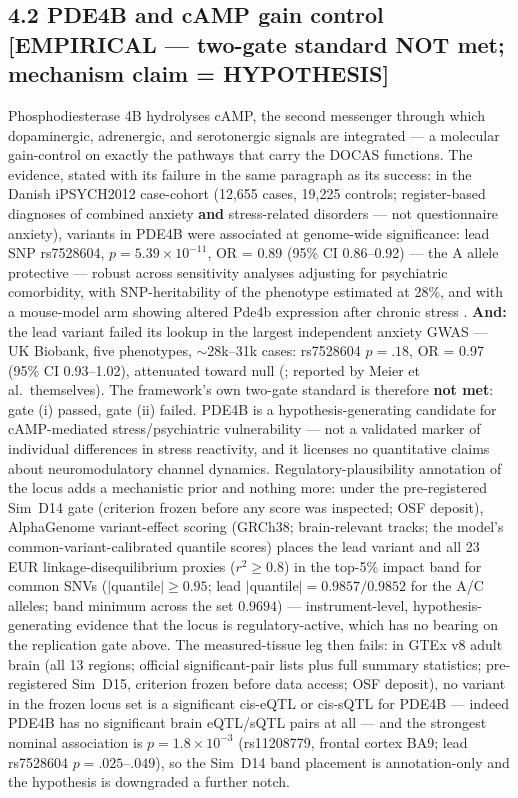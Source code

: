 \documentclass[
]{article}
\begin{document}
\subsection{4.2 PDE4B and cAMP gain control {[}EMPIRICAL --- two-gate
standard NOT met; mechanism claim =
HYPOTHESIS{]}}\label{pde4b-and-camp-gain-control-empirical-two-gate-standard-not-met-mechanism-claim-hypothesis}

Phosphodiesterase 4B hydrolyses cAMP, the second messenger through which
dopaminergic, adrenergic, and serotonergic signals are integrated --- a
molecular gain-control on exactly the pathways that carry the DOCAS
functions. The evidence, stated with its failure in the same paragraph
as its success: in the Danish iPSYCH2012 case-cohort (12,655 cases,
19,225 controls; register-based diagnoses of combined anxiety
\textbf{and} stress-related disorders --- not questionnaire anxiety),
variants in PDE4B were associated at genome-wide significance: lead SNP
rs7528604, \(p = 5.39 \times 10^{-11}\), OR = 0.89 (95\% CI 0.86--0.92)
--- the A allele protective --- robust across sensitivity analyses
adjusting for psychiatric comorbidity, with SNP-heritability of the
phenotype estimated at 28\%, and with a mouse-model arm showing altered
Pde4b expression after chronic stress . \textbf{And:} the lead variant
failed its lookup in the largest independent anxiety GWAS --- UK
Biobank, five phenotypes, \(\sim\)28k--31k cases: rs7528604 \(p = .18\),
OR = 0.97 (95\% CI 0.93--1.02), attenuated toward null (; reported by
Meier et al.~themselves). The framework's own two-gate standard is
therefore \textbf{not met}: gate (i) passed, gate (ii) failed. PDE4B is
a hypothesis-generating candidate for cAMP-mediated stress/psychiatric
vulnerability --- not a validated marker of individual differences in
stress reactivity, and it licenses no quantitative claims about
neuromodulatory channel dynamics. Regulatory-plausibility annotation of
the locus adds a mechanistic prior and nothing more: under the
pre-registered Sim~D14 gate (criterion frozen before any score was
inspected; OSF deposit), AlphaGenome variant-effect scoring (GRCh38;
brain-relevant tracks; the model's common-variant-calibrated quantile
scores) places the lead variant and all 23 EUR linkage-disequilibrium
proxies (\(r^2 \geq 0.8\)) in the top-5\% impact band for common SNVs
(\(|\)quantile\(| \geq 0.95\); lead \(|\)quantile\(| = 0.9857/0.9852\)
for the A/C alleles; band minimum across the set \(0.9694\)) ---
instrument-level, hypothesis-generating evidence that the locus is
regulatory-active, which has no bearing on the replication gate above.
The measured-tissue leg then fails: in GTEx v8 adult brain (all 13
regions; official significant-pair lists plus full summary statistics;
pre-registered Sim~D15, criterion frozen before data access; OSF
deposit), no variant in the frozen locus set is a significant cis-eQTL
or cis-sQTL for PDE4B --- indeed PDE4B has no significant brain
eQTL/sQTL pairs at all --- and the strongest nominal association is
\(p = 1.8 \times 10^{-3}\) (rs11208779, frontal cortex BA9; lead
rs7528604 \(p = .025\)--\(.049\)), so the Sim~D14 band placement is
annotation-only and the hypothesis is downgraded a further notch.
\end{document}
